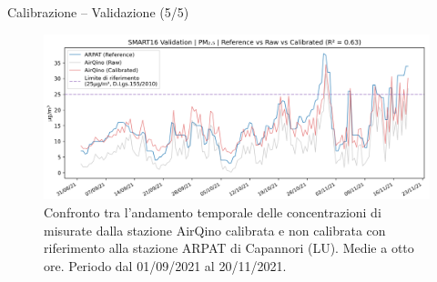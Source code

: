 \begin{frame}{Calibrazione – Validazione (5/5)}
\begin{center}
\begin{figure}[H]
\centering
\captionsetup{justification=centering}
\includegraphics[width=\textwidth]{images/val_pm2.5.png}
\caption{Confronto tra l’andamento temporale delle concentrazioni di  misurate dalla stazione AirQino calibrata e non calibrata con riferimento alla stazione ARPAT di Capannori (LU). Medie a otto ore. Periodo dal 01/09/2021 al 20/11/2021.}
\end{figure}
\end{center}
\end{frame}

